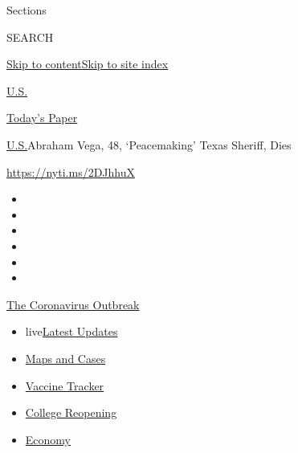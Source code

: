 Sections

SEARCH

\protect\hyperlink{site-content}{Skip to
content}\protect\hyperlink{site-index}{Skip to site index}

\href{https://www.nytimes.com/section/us}{U.S.}

\href{https://myaccount.nytimes.com/auth/login?response_type=cookie\&client_id=vi}{}

\href{https://www.nytimes.com/section/todayspaper}{Today's Paper}

\href{/section/us}{U.S.}\textbar{}Abraham Vega, 48, `Peacemaking' Texas
Sheriff, Dies

\url{https://nyti.ms/2DJhhuX}

\begin{itemize}
\item
\item
\item
\item
\item
\item
\end{itemize}

\href{https://www.nytimes.com/news-event/coronavirus?action=click\&pgtype=Article\&state=default\&region=TOP_BANNER\&context=storylines_menu}{The
Coronavirus Outbreak}

\begin{itemize}
\tightlist
\item
  live\href{https://www.nytimes.com/2020/08/03/world/coronavirus-covid-19.html?action=click\&pgtype=Article\&state=default\&region=TOP_BANNER\&context=storylines_menu}{Latest
  Updates}
\item
  \href{https://www.nytimes.com/interactive/2020/us/coronavirus-us-cases.html?action=click\&pgtype=Article\&state=default\&region=TOP_BANNER\&context=storylines_menu}{Maps
  and Cases}
\item
  \href{https://www.nytimes.com/interactive/2020/science/coronavirus-vaccine-tracker.html?action=click\&pgtype=Article\&state=default\&region=TOP_BANNER\&context=storylines_menu}{Vaccine
  Tracker}
\item
  \href{https://www.nytimes.com/2020/08/02/us/covid-college-reopening.html?action=click\&pgtype=Article\&state=default\&region=TOP_BANNER\&context=storylines_menu}{College
  Reopening}
\item
  \href{https://www.nytimes.com/live/2020/08/03/business/stock-market-today-coronavirus?action=click\&pgtype=Article\&state=default\&region=TOP_BANNER\&context=storylines_menu}{Economy}
\end{itemize}

